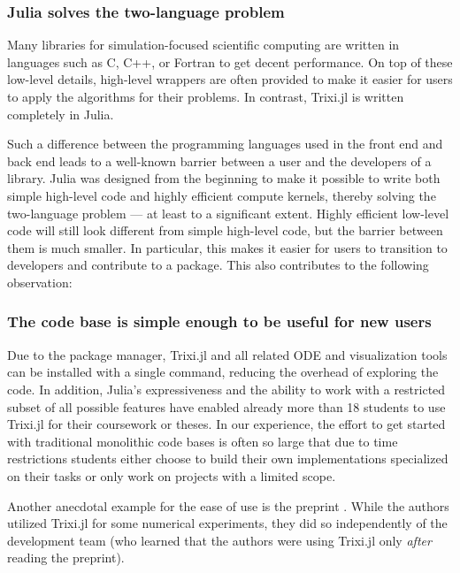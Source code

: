 \documentclass[hidelinks]{juliacon} %
\newcommand{\trixi}{Trixi.jl\xspace}
\begin{document}
\subsubsection{Julia solves the two-language problem}

Many libraries for simulation-focused scientific computing are written in
languages such as C, C++, or Fortran to get decent performance. On top of these
low-level details, high-level wrappers are often provided to make it easier
for users to apply the algorithms for their problems. In contrast, \trixi is
written completely in Julia.

Such a difference between the programming languages used in the front end and
back end leads to a well-known barrier between a user and the developers of a library.
Julia was designed from the beginning to make it possible to write both simple
high-level code and highly efficient compute kernels, thereby solving the
two-language problem --- at least to a significant extent. Highly efficient low-level
code will still look different from simple high-level code, but the
barrier between them is much smaller. In particular, this makes it easier for
users to transition to developers and contribute to a package. This also contributes
to the following observation:

\subsubsection{The code base is simple enough to be useful for new users}

Due to the package manager, \trixi and all related ODE and visualization tools
can be installed with a single command, reducing the overhead of exploring the
code. In addition, Julia's expressiveness and the ability to work with a restricted
subset of all possible features have enabled already more than 18 students to use \trixi
for their coursework or theses. In our experience, the effort to get
started with traditional monolithic code bases is often so large that due to time restrictions
students either choose to build their own implementations specialized on their tasks or only work on
projects with a limited scope.

Another anecdotal example for the ease of use is the preprint \cite{singh2021linear}.
While the authors utilized \trixi for some numerical experiments, they did so
independently of the development team (who learned that the authors were
using \trixi only \textit{after} reading the preprint).
\end{document}
